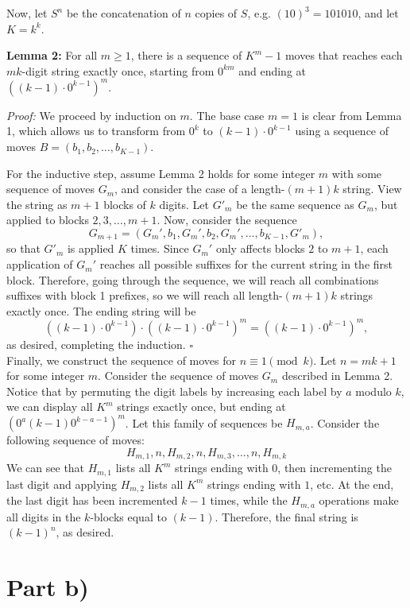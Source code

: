 \documentclass{article}
\begin{document}
    Now, let $S^n$ be the concatenation of $n$ copies of $S$, e.g. $(10)^3 = 101010$, and let $K = k^k$.
    
    \textbf{Lemma 2:} For all $m\geq 1$, there is a sequence of $K^m - 1$ moves that reaches each $mk$-digit string exactly once, starting from $0^{km}$ and ending at $((k - 1)\cdot 0^{k - 1})^m$.

    \textit{Proof:} We proceed by induction on $m$. The base case $m = 1$ is clear from Lemma 1, which allows us to transform from $0^k$ to $(k - 1)\cdot 0^{k - 1}$ using a sequence of moves $B = (b_1, b_2, \dots, b_{K - 1})$.

    For the inductive step, assume Lemma 2 holds for some integer $m$ with some sequence of moves $G_m$, and consider the case of a length-$(m + 1)k$ string. View the string as $m + 1$ blocks of $k$ digits. Let $G'_m$ be the same sequence as $G_m$, but applied to blocks $2, 3, \dots, m + 1$. Now, consider the sequence $$G_{m + 1} = (G_m', b_1, G_m', b_2, G_m', \dots, b_{K - 1}, G'_m),$$
    so that $G'_m$ is applied $K$ times. Since $G_m'$ only affects blocks $2$ to $m + 1$, each application of $G_m'$ reaches all possible suffixes for the current string in the first block. Therefore, going through the sequence, we will reach all combinations suffixes with block 1 prefixes, so we will reach all length-$(m + 1)k$ strings exactly once. The ending string will be $$((k - 1)\cdot 0^{k - 1})\cdot ((k - 1)\cdot 0^{k - 1})^m = ((k - 1)\cdot 0^{k - 1})^m,$$
    as desired, completing the induction. $\square$\\

    Finally, we construct the sequence of moves for $n\equiv 1 \pmod k$. Let $n = mk + 1$ for some integer $m$. Consider the sequence of moves $G_m$ described in Lemma 2. Notice that by permuting the digit labels by increasing each label by $a$ modulo $k$, we can display all $K^m$ strings exactly once, but ending at $(0^{a}(k - 1)0^{k - a - 1})^m$. Let this family of sequences be $H_{m, a}$. Consider the following sequence of moves:
    $$H_{m, 1}, n, H_{m, 2}, n,H_{m, 3}, \dots, n, H_{m, k}$$
    We can see that $H_{m, 1}$ lists all $K^m$ strings ending with $0$, then incrementing the last digit and applying $H_{m, 2}$ lists all $K^m$ strings ending with $1$, etc. At the end, the last digit has been incremented $k - 1$ times, while the $H_{m, a}$ operations make all digits in the $k$-blocks equal to $(k - 1)$. Therefore, the final string is $(k - 1)^n$, as desired.

    \section*{Part b)}
\end{document}
